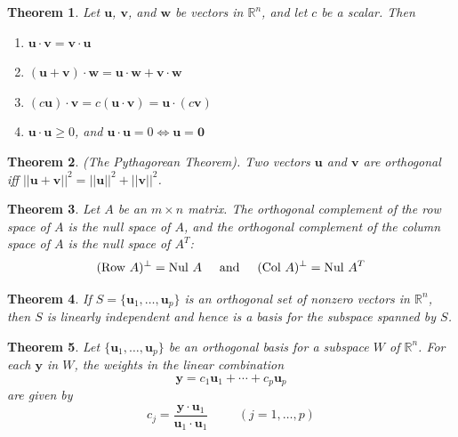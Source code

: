 \documentclass{article}
\theoremstyle{plain}
\newtheorem{thm}{Theorem}[section]
\theoremstyle{definition}
\theoremstyle{remark}
\begin{document}
\begin{thm} Let \(\textbf{u}\), \(\textbf{v}\), and \(\textbf{w}\) be vectors in \(\mathbb{R}^n\), and let \(c\) be a scalar. Then
    \begin{enumerate}
        \item[a.] \(\textbf{u}\cdot\textbf{v}=\textbf{v}\cdot\textbf{u}\)
        \item[b.] \((\textbf{u}+\textbf{v})\cdot\textbf{w}=\textbf{u}\cdot\textbf{w}+\textbf{v}\cdot\textbf{w}\)
        \item[c.] \((c\textbf{u})\cdot\textbf{v}=c(\textbf{u}\cdot\textbf{v})=\textbf{u}\cdot(c\textbf{v})\)
        \item[d.] \(\textbf{u}\cdot\textbf{u}\geq0\), \hspace{.5cm} and \(\textbf{u}\cdot\textbf{u}=0\iff\textbf{u}=\textbf{0}\)
    \end{enumerate}
\end{thm}

\begin{thm} (The Pythagorean Theorem). 
    Two vectors \(\textbf{u}\) and \(\textbf{v}\) are orthogonal iff \(||\textbf{u}+\textbf{v}||^2=||\textbf{u}||^2+||\textbf{v}||^2\).
\end{thm}

\begin{thm} 
    Let \(A\) be an \(m\times n\) matrix. The orthogonal complement of the row space of \(A\) is the null space of \(A\), and the orthogonal complement of the column space of \(A\) is the null space of \(A^T\): \[(\text{Row }A)^{\perp}=\text{Nul }A\hspace{.5cm}\text{and}\hspace{.5cm}(\text{Col }A)^{\perp}=\text{Nul }A^T\]
\end{thm}

\begin{thm} 
    If \(S=\{\textbf{u}_1,\ldots,\textbf{u}_p\}\) is an orthogonal set of nonzero vectors in \(\mathbb{R}^n\), then \(S\) is linearly independent and hence is a basis for the subspace spanned by \(S\).
\end{thm}

\begin{thm} 
    Let \(\{\textbf{u}_1,\ldots,\textbf{u}_p\}\) be an orthogonal basis for a subspace \(W\) of \(\mathbb{R}^n\). For each \(\textbf{y}\) in \(W\), the weights in the linear combination \[\textbf{y}=c_1\textbf{u}_1+\cdots+c_p\textbf{u}_p\] are given by \[c_j=\frac{\textbf{y}\cdot\textbf{u}_1}{\textbf{u}_1\cdot\textbf{u}_1}\hspace{1cm}(j=1,\ldots,p)\]
\end{thm}
\end{document}

